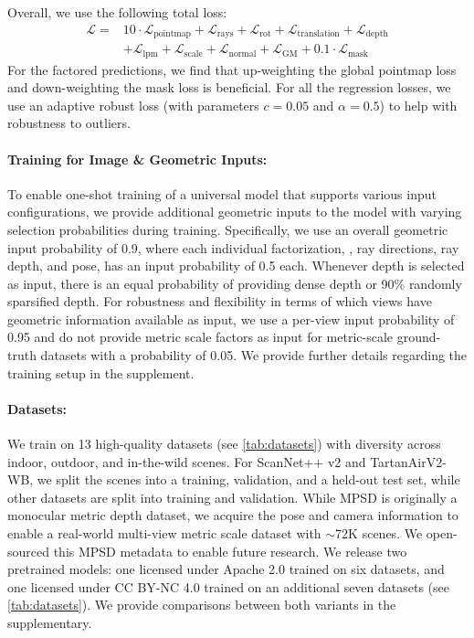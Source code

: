 \noindent Overall, we use the following total loss: 
\begin{equation}
\begin{split}
    \label{eq:training_loss}
    \mathcal{L}
    =
    &10 \cdot \mathcal{L}_\text{pointmap}
    + \mathcal{L}_\text{rays}
    + \mathcal{L}_\text{rot}
    + \mathcal{L}_\text{translation}
    + \mathcal{L}_\text{depth}
    \\
    &+ \mathcal{L}_\text{lpm}
    + \mathcal{L}_\text{scale}
    + \mathcal{L}_\text{normal}
    + \mathcal{L}_\text{GM}
    + 0.1 \cdot \mathcal{L}_\text{mask}
\end{split}
\end{equation}
For the factored predictions, we find that up-weighting the global pointmap loss and down-weighting the mask loss is beneficial.
For all the regression losses, we use an adaptive robust loss \cite{Barro2019} (with parameters $c=0.05$ and $\alpha=0.5$) to help with robustness to outliers.

\paragraph{Training for Image \& Geometric Inputs:}
\label{para:aug_training}
To enable one-shot training of a universal model that supports various input configurations, we provide additional geometric inputs to the model with varying selection probabilities during training.
Specifically, we use an overall geometric input probability of 0.9, where each individual factorization, \ie, ray directions, ray depth, and pose, has an input probability of 0.5 each.
Whenever depth is selected as input, there is an equal probability of providing dense depth or 90\% randomly sparsified depth.
For robustness and flexibility in terms of which views have geometric information available as input, we use a per-view input probability of 0.95 and do not provide metric scale factors as input for metric-scale ground-truth datasets with a probability of 0.05.
We provide further details regarding the training setup in the supplement.



\paragraph{Datasets:}
We train \coolname on 13 high-quality datasets (see \cref{tab:datasets}) with diversity across indoor, outdoor, and in-the-wild scenes.
For ScanNet++ v2 and TartanAirV2-WB, we split the scenes into a training, validation, and a held-out test set, while other datasets are split into training and validation.
While MPSD is originally a monocular metric depth dataset, we acquire the pose and camera information to enable a real-world multi-view metric scale dataset with $\sim$72K scenes.
We open-sourced this MPSD metadata to enable future research.
We release two pretrained models: one licensed under Apache 2.0 trained on six datasets, and one licensed under CC BY-NC 4.0 trained on an additional seven datasets (see \cref{tab:datasets}).
We provide comparisons between both variants in the supplementary.


